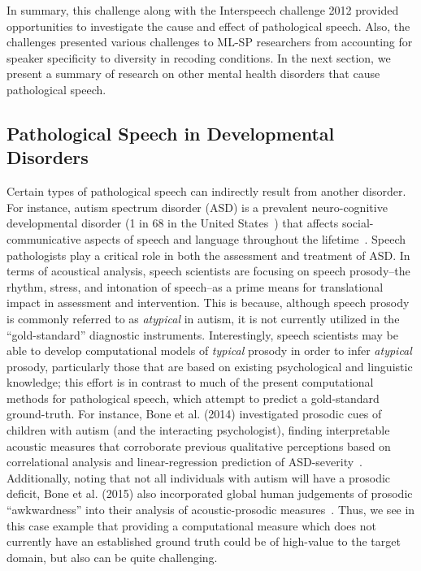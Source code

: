 \documentclass{article}
\begin{document}
In summary, this challenge along with the Interspeech challenge 2012 provided opportunities to investigate the cause and effect of pathological speech.
Also, the challenges presented various challenges to ML-SP researchers from accounting for speaker specificity to diversity in recoding conditions.
In the next section, we present a summary of research on other mental health disorders that cause pathological speech.

\subsection{Pathological Speech in Developmental Disorders}
Certain types of pathological speech can indirectly result from another disorder. For instance, autism spectrum disorder (ASD) is a prevalent neuro-cognitive developmental disorder (1 in 68 in the United States~\cite{baio2014prevalence}) that affects social-communicative aspects of speech and language throughout the lifetime~\cite{american2013diagnostic}. Speech pathologists play a critical role in both the assessment and treatment of ASD. In terms of acoustical analysis, speech scientists are focusing on speech prosody--the rhythm, stress, and intonation of speech--as a prime means for translational impact in assessment and intervention. This is because, although speech prosody is commonly referred to as {\it atypical} in autism, it is not currently utilized in the ``gold-standard'' diagnostic instruments. Interestingly, speech scientists may be able to develop computational models of {\it typical} prosody in order to infer {\it atypical} prosody, particularly those that are based on existing psychological and linguistic knowledge; this effort is in contrast to much of the present computational methods for pathological speech, which attempt to predict a gold-standard ground-truth. For instance, Bone et al. (2014) investigated prosodic cues of children with autism (and the interacting psychologist), finding interpretable acoustic measures that corroborate previous qualitative perceptions based on correlational analysis and linear-regression prediction of ASD-severity~\cite{bone2014psychologist}. Additionally, noting that not all individuals with autism will have a prosodic deficit, Bone et al. (2015) also incorporated global human judgements of prosodic ``awkwardness'' into their analysis of acoustic-prosodic measures~\cite{bone2015acoustic}. Thus, we see in this case example that providing a computational measure which does not currently have an established ground truth  could be of high-value to the target domain, but also can be quite challenging.
\end{document}
